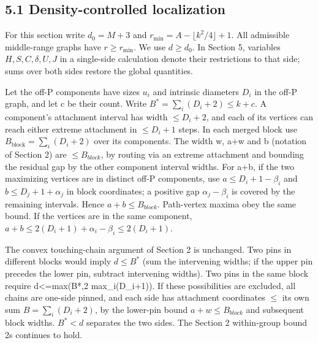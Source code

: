 \documentclass[
  11pt,
]{article}
\begin{document}
\subsection{5.1 Density-controlled
localization}\label{density-controlled-localization}

For this section write \(d_0=M+3\) and
\(r_{\min}=A-\lfloor k^2/4\rfloor+1\). All admissible middle-range
graphs have \(r\ge r_{\min}\). We use \(d\ge d_0\). In Section 5,
variables \(H,S,C,\delta,U,J\) in a single-side calculation denote their
restrictions to that side; sums over both sides restore the global
quantities.

Let the off-P components have sizes \(u_{i}\) and intrinsic diameters
\(D_{i}\) in the off-P graph, and let c be their count. Write
\(B^*=\sum_i(D_i+2)\le k+c\). A component's attachment interval has
width \(\le D_{i}+2\), and each of its vertices can reach either extreme
attachment in \(\le D_{i}+1\) steps. In each merged block use
\(B_{\mathrm{block}}=\sum_i(D_i+2)\) over its components. The width w,
a+w and b (notation of Section 2) are \(\le B_{block}\), by routing via
an extreme attachment and bounding the residual gap by the other
component interval widths. For a+b, if the two maximizing vertices are
in distinct off-P components, use \(a\le D_{i}+1-\beta _{i}\) and
\(b\le D_{j}+1+\alpha _{j}\) in block coordinates; a positive gap
\(\alpha _{j}-\beta _{i}\) is covered by the remaining intervals. Hence
\(a+b\le B_{block}\). Path-vertex maxima obey the same bound. If the
vertices are in the same component,
\(a+b\le 2(D_{i}+1)+\alpha _{i}-\beta _{i}\le 2(D_{i}+1)\).

The convex touching-chain argument of Section 2 is unchanged. Two pins
in different blocks would imply \(d\le B^*\) (sum the intervening
widths; if the upper pin precedes the lower pin, subtract intervening
widths). Two pins in the same block require d\textless=max(B*,2
max\_i(D\_i+1)). If these possibilities are excluded, all chains are
one-side pinned, and each side has attachment coordinates \(\le\) its
own sum \(B=\sum_i(D_i+2)\), by the lower-pin bound \(a+w\le B_{block}\)
and subsequent block widths. \(B^*<d\) separates the two sides. The
Section 2 within-group bound 2s continues to hold.
\end{document}
